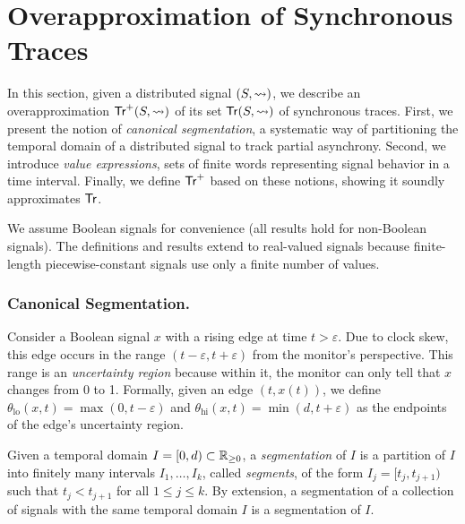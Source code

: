 \section{Overapproximation of Synchronous Traces} 
\label{sec:approach}

In this section, given a distributed signal $(S,{\rightsquigarrow})$, we describe an overapproximation $\mathsf{Tr}^+(S,{\rightsquigarrow})$ of its set $\mathsf{Tr}(S,{\rightsquigarrow})$ of synchronous traces.
First, we present the notion of \emph{canonical segmentation}, a systematic way of partitioning the temporal domain of a distributed signal to track partial asynchrony.
Second, we introduce \emph{value expressions}, sets of finite words representing signal behavior in a time interval.
Finally, we define $\mathsf{Tr}^+$ based on these notions, showing it soundly approximates $\mathsf{Tr}$.

\begin{remark}
	We assume Boolean signals for convenience (all results hold for non-Boolean signals).
	The definitions and results extend to real-valued signals because finite-length piecewise-constant signals use only a finite number of values.
\end{remark}

\subsubsection{Canonical Segmentation.}
Consider a Boolean signal $x$ with a rising edge at time $t > \varepsilon$.
Due to clock skew, this edge occurs in the range $(t - \varepsilon, t + \varepsilon)$ from the monitor's perspective.
This range is an \emph{uncertainty region} because within it, the monitor can only tell that $x$ changes from 0 to 1. Formally, given an edge $(t, x(t))$, we define $\theta_{\text{lo}}(x,t) = \max(0, t - \varepsilon)$ and $\theta_{\text{hi}}(x,t) = \min(d, t + \varepsilon)$ as the endpoints of the edge's uncertainty region.

Given a temporal domain $I = [0,d) \subset \mathbb{R}_{\geq 0}$, a \emph{segmentation} of $I$ is a partition of $I$ into finitely many intervals $I_1, \ldots, I_k$, called \emph{segments}, of the form $I_j = [t_j, t_{j+1})$ such that $t_j < t_{j+1}$ for all $1 \leq j \leq k$.
By extension, a segmentation of a collection of signals with the same temporal domain $I$ is a segmentation of $I$.

